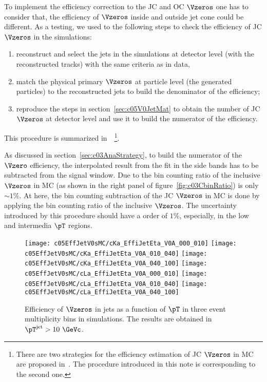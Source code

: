 To implement the efficiency correction to the JC and OC $\Vzeros$ one has to
consider that,
the efficiency of $\Vzeros$ inside and outside jet cone could be different.
As a testing, we used to the following steps to check the efficiency of
JC $\Vzeros$
in the simulations:
\begin{enumerate}
\item reconstruct and select the jets in the simulations at
      detector level (with the reconstructed tracks) with the same criteria
      as in data,
\item match the physical primary $\Vzeros$ at particle level (the generated
      particles) to the reconstructed jets to build the denominator of
      the efficiency;
\item reproduce the steps in section~\ref{sec:c05V0JetMat} to obtain the
      number of JC $\Vzeros$ at detector level and use it to build the
      numerator of the efficiency.
\end{enumerate}
This procedure is summarized
in~\cite{Zimmermann:AliPWGJE20140401}~\footnote{There are two strategies for
the efficiency estimation of JC $\Vzeros$  in MC are proposed
in~\cite{Zimmermann:AliPWGJE20140401}.
The procedure introduced in this note is corresponding to the second one.}.

As discussed in section~\ref{sec:c03AnaStrategy},
to build the numerator of the $\Vzero$ efficiency,
the interpolated result from the fit in the side bands has to be subtracted
from the signal window.
Due to the bin counting ratio of the inclusive $\Vzeros$ in MC (as shown in
the right panel of figure~\ref{fig:c03CbinRatio}) is only $\sim 1\%$.
At here, the bin counting subtraction of the JC $\Vzeros$ in MC is done
by applying the bin counting ratio of the inclusive $\Vzeros$.
The uncertainty introduced by this procedure should have a order of $1\%$,
especially, in the low and intermedia $\pT$ regions.

\begin{figure}[htb]
\begin{center}
\texttt{[image: c05EffJetV0sMC/cKa\_EffiJetEta\_V0A\_000\_010]}
\texttt{[image: c05EffJetV0sMC/cKa\_EffiJetEta\_V0A\_010\_040]}
\texttt{[image: c05EffJetV0sMC/cKa\_EffiJetEta\_V0A\_040\_100]}
\texttt{[image: c05EffJetV0sMC/cLa\_EffiJetEta\_V0A\_000\_010]}
\texttt{[image: c05EffJetV0sMC/cLa\_EffiJetEta\_V0A\_010\_040]}
\texttt{[image: c05EffJetV0sMC/cLa\_EffiJetEta\_V0A\_040\_100]}
\caption{Efficiency of $\Vzeros$ in jets as a function of $\pT$
         in three event multiplicity bins in simulations.
         The results are obtained in $\pT^{\rm jet}>10~\GeVc$.}
\label{fig:c05EffiJetV0sMC}
\end{center}
\end{figure}

